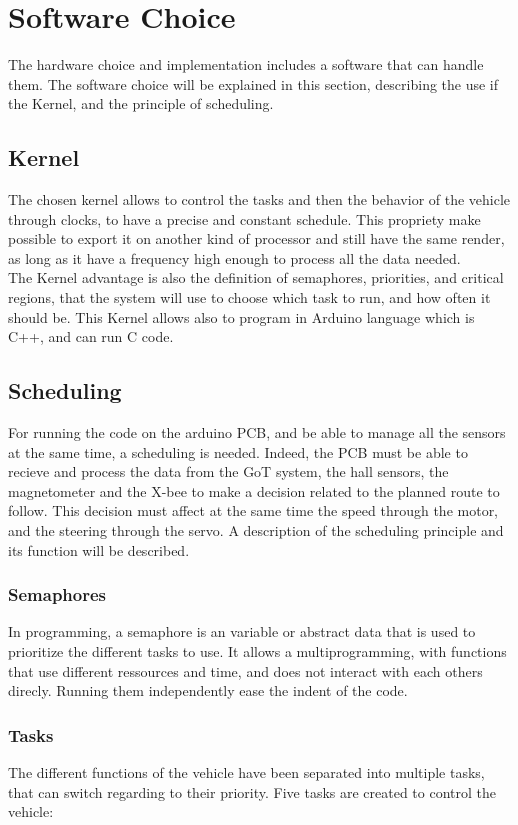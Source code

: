 \section{Software Choice}
The hardware choice and implementation includes a software that can handle them. The software choice will be explained in this section, describing the use if the Kernel, and the principle of scheduling.


\subsection{Kernel}
The chosen kernel allows to control the tasks and then the behavior of the vehicle through clocks, to have a precise and constant schedule. This propriety make possible to export it on another kind of processor and still have the same render, as long as it have a frequency high enough to process all the data needed.\\
The Kernel advantage is also the definition of semaphores, priorities, and critical regions, that the system will use to choose which task to run, and how often it should be. This Kernel allows also to program in Arduino language which is C++, and can run C code.

\subsection{Scheduling}
For running the code on the arduino PCB, and be able to manage all the sensors at the same time, a scheduling is needed. Indeed, the PCB must be able to recieve and process the data from the GoT system, the hall sensors, the magnetometer and the X-bee to make a decision related to the planned route to follow. This decision must affect at the same time the speed through the motor, and the steering through the servo.
A description of the scheduling principle and its function will be described.

\subsubsection{Semaphores}
In programming, a semaphore is an variable or abstract data that is used to prioritize the different tasks to use. It allows a multiprogramming, with functions that use different ressources and time, and does not interact with each others direcly. Running them independently ease the indent of the code.

\subsubsection{Tasks}
The different functions of the vehicle have been separated into multiple tasks, that can switch regarding to their priority. Five tasks are created to control the vehicle:

